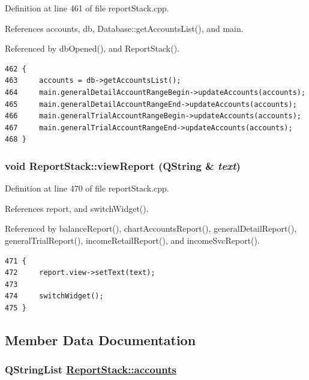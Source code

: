 Definition at line 461 of file report\-Stack.cpp.

References accounts, db, Database::get\-Accounts\-List(), and main.

Referenced by db\-Opened(), and Report\-Stack().

\footnotesize\begin{verbatim}462 {
463     accounts = db->getAccountsList();
464     main.generalDetailAccountRangeBegin->updateAccounts(accounts);
465     main.generalDetailAccountRangeEnd->updateAccounts(accounts);
466     main.generalTrialAccountRangeBegin->updateAccounts(accounts);
467     main.generalTrialAccountRangeEnd->updateAccounts(accounts);
468 }
\end{verbatim}\normalsize 


\hypertarget{classReportStack_k4}{
\subsubsection[viewReport]{\setlength{\rightskip}{0pt plus 5cm}void Report\-Stack::view\-Report (QString \& {\em text})}}
\label{classReportStack_k4}


Definition at line 470 of file report\-Stack.cpp.

References report, and switch\-Widget().

Referenced by balance\-Report(), chart\-Accounts\-Report(), general\-Detail\-Report(), general\-Trial\-Report(), income\-Retail\-Report(), and income\-Svc\-Report().

\footnotesize\begin{verbatim}471 {
472     report.view->setText(text);
473 
474     switchWidget();
475 }
\end{verbatim}\normalsize 




\subsection{Member Data Documentation}
\hypertarget{classReportStack_r7}{
\subsubsection[accounts]{\setlength{\rightskip}{0pt plus 5cm}QString\-List \hyperlink{classReportStack_r7}{Report\-Stack::accounts}}}
\label{classReportStack_r7}



